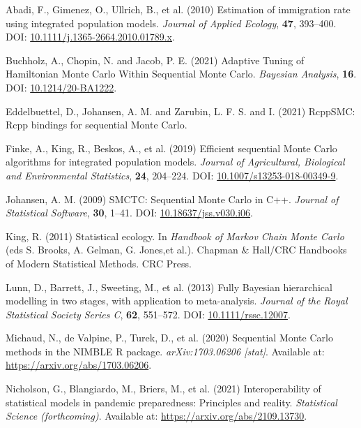 \documentclass[
  10pt,
  a4paper,
]{article}
\newlength{\cslhangindent}
\newlength{\cslentryspacingunit} %
\newenvironment{CSLReferences}[2] %
 {%
  \setlength{\parindent}{0pt}
  \ifodd #1
  \let\oldpar\par
  \def\par{\hangindent=\cslhangindent\oldpar}
  \fi
  \setlength{\parskip}{#2\cslentryspacingunit}
 }%
 {}
\begin{document}
\hypertarget{refs}{}
\begin{CSLReferences}{1}{0}
\leavevmode{}%
Abadi, F., Gimenez, O., Ullrich, B., et al. (2010) Estimation of
immigration rate using integrated population models. \emph{Journal of
Applied Ecology}, \textbf{47}, 393--400. DOI:
\href{https://doi.org/10.1111/j.1365-2664.2010.01789.x}{10.1111/j.1365-2664.2010.01789.x}.

\leavevmode{}%
Buchholz, A., Chopin, N. and Jacob, P. E. (2021) Adaptive {Tuning} of
{Hamiltonian Monte Carlo Within Sequential Monte Carlo}. \emph{Bayesian
Analysis}, \textbf{16}. DOI:
\href{https://doi.org/10.1214/20-BA1222}{10.1214/20-BA1222}.

\leavevmode{}%
Eddelbuettel, D., Johansen, A. M. and Zarubin, L. F. S. and I. (2021)
{RcppSMC}: {Rcpp} bindings for sequential {Monte Carlo}.

\leavevmode{}%
Finke, A., King, R., Beskos, A., et al. (2019) Efficient sequential
{Monte Carlo} algorithms for integrated population models. \emph{Journal
of Agricultural, Biological and Environmental Statistics}, \textbf{24},
204--224. DOI:
\href{https://doi.org/10.1007/s13253-018-00349-9}{10.1007/s13253-018-00349-9}.

\leavevmode{}%
Johansen, A. M. (2009) {SMCTC}: {Sequential Monte Carlo} in {C}++.
\emph{Journal of Statistical Software}, \textbf{30}, 1--41. DOI:
\href{https://doi.org/10.18637/jss.v030.i06}{10.18637/jss.v030.i06}.

\leavevmode{}%
King, R. (2011) Statistical ecology. In \emph{Handbook of {Markov Chain
Monte Carlo}} (eds S. Brooks, A. Gelman, G. Jones,et al.). Chapman
{\(\&\)} {Hall}/{CRC Handbooks} of {Modern Statistical Methods}. {CRC
Press}.

\leavevmode{}%
Lunn, D., Barrett, J., Sweeting, M., et al. (2013) Fully {Bayesian}
hierarchical modelling in two stages, with application to meta-analysis.
\emph{Journal of the Royal Statistical Society Series C}, \textbf{62},
551--572. DOI:
\href{https://doi.org/10.1111/rssc.12007}{10.1111/rssc.12007}.

\leavevmode{}%
Michaud, N., de Valpine, P., Turek, D., et al. (2020) Sequential {Monte
Carlo} methods in the {NIMBLE R} package. \emph{arXiv:1703.06206
{[}stat{]}}. Available at: \url{https://arxiv.org/abs/1703.06206}.

\leavevmode{}%
Nicholson, G., Blangiardo, M., Briers, M., et al. (2021)
Interoperability of statistical models in pandemic preparedness:
Principles and reality. \emph{Statistical Science (forthcoming)}.
Available at: \url{https://arxiv.org/abs/2109.13730}.

\end{CSLReferences}
\end{document}
